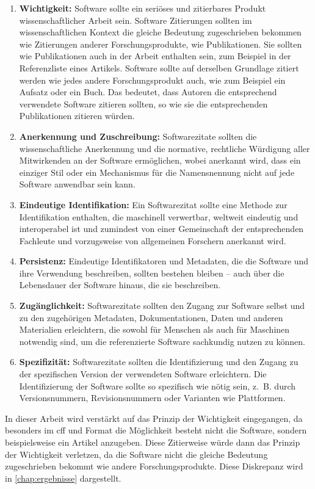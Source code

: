 \begin{enumerate}
    \item \textbf{Wichtigkeit:} Software sollte ein seriöses und zitierbares Produkt wissenschaftlicher Arbeit sein. Software Zitierungen sollten im wissenschaftlichen Kontext die gleiche Bedeutung zugeschrieben bekommen wie Zitierungen anderer Forschungsprodukte, wie Publikationen. Sie sollten wie Publikationen auch in der Arbeit enthalten sein, zum Beispiel in der Referenzliste eines Artikels. Software sollte auf derselben Grundlage zitiert werden wie jedes andere Forschungsprodukt auch, wie zum Beispiel ein Aufsatz oder ein Buch. Das bedeutet, dass Autoren die entsprechend verwendete Software zitieren sollten, so wie sie die entsprechenden Publikationen zitieren würden.
    \item \textbf{Anerkennung und Zuschreibung:} Softwarezitate sollten die wissenschaftliche Anerkennung und die normative, rechtliche Würdigung aller Mitwirkenden an der Software ermöglichen, wobei anerkannt wird, dass ein einziger Stil oder ein Mechanismus für die Namensnennung nicht auf jede Software anwendbar sein kann.
    \item \textbf{Eindeutige Identifikation:} Ein Softwarezitat sollte eine Methode zur Identifikation enthalten, die maschinell verwertbar, weltweit eindeutig und interoperabel ist und zumindest von einer Gemeinschaft der entsprechenden Fachleute und vorzugsweise von allgemeinen Forschern anerkannt wird.
    \item \textbf{Persistenz:} Eindeutige Identifikatoren und Metadaten, die die Software und ihre Verwendung beschreiben, sollten bestehen bleiben – auch über die Lebensdauer der Software hinaus, die sie beschreiben.
    \item \textbf{Zugänglichkeit:} Softwarezitate sollten den Zugang zur Software selbst und zu den zugehörigen Metadaten, Dokumentationen, Daten und anderen Materialien erleichtern, die sowohl für Menschen als auch für Maschinen notwendig sind, um die referenzierte Software sachkundig nutzen zu können.
    \item \textbf{Spezifizität:} Softwarezitate sollten die Identifizierung und den Zugang zu der spezifischen Version der verwendeten Software erleichtern. Die Identifizierung der Software sollte so spezifisch wie nötig sein, z. B. durch Versionsnummern, Revisionsnummern oder Varianten wie Plattformen.
\end{enumerate}

In dieser Arbeit wird verstärkt auf das Prinzip der Wichtigkeit eingegangen, da besonders im \gls{cff} und  Format die Möglichkeit besteht nicht die Software, sondern beispielsweise ein Artikel anzugeben.
Diese Zitierweise würde dann das Prinzip der Wichtigkeit verletzen, da die Software nicht die gleiche Bedeutung zugeschrieben bekommt wie andere Forschungsprodukte.
Diese Diskrepanz wird in \autoref{chap:ergebnisse} dargestellt.


